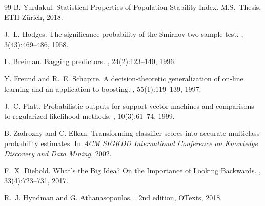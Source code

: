 \documentclass[11pt,a4paper]{article}
\begin{document}
\begin{thebibliography}{99}
B. Yurdakul.
\newblock Statistical Properties of Population Stability Index.
\newblock M.S.\ Thesis, ETH Z\"urich, 2018.

J.~L. Hodges.
\newblock The significance probability of the Smirnov two-sample test.
, 3(43):469--486, 1958.

L. Breiman.
\newblock Bagging predictors.
, 24(2):123--140, 1996.

Y. Freund and R.~E. Schapire.
\newblock A decision-theoretic generalization of on-line learning and an
application to boosting.
, 55(1):119--139, 1997.

J.~C. Platt.
\newblock Probabilistic outputs for support vector machines and comparisons
to regularized likelihood methods.
, 10(3):61--74, 1999.

B. Zadrozny and C. Elkan.
\newblock Transforming classifier scores into accurate multiclass
probability estimates.
\newblock In {\em ACM SIGKDD International Conference on Knowledge Discovery
and Data Mining}, 2002.

F.~X. Diebold.
\newblock What's the Big Idea? On the Importance of Looking Backwards.
, 33(4):723--731, 2017.

R.~J. Hyndman and G. Athanasopoulos.
.
\newblock 2nd edition, OTexts, 2018.

\end{thebibliography}
\end{document}
